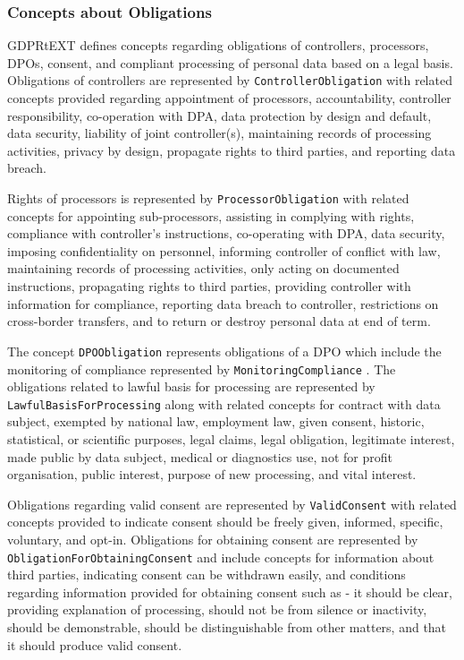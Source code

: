 \subsubsection{Concepts about Obligations}
GDPRtEXT defines concepts regarding obligations of controllers, processors, DPOs, consent, and compliant processing of personal data based on a legal basis. Obligations of controllers are represented by \texttt{ControllerObligation} with related concepts provided regarding  appointment of processors, accountability, controller responsibility, co-operation with DPA, data protection by design and default, data security, liability of joint controller(s), maintaining records of processing activities, privacy by design, propagate rights to third parties, and reporting data breach.

Rights of processors is represented by \texttt{ProcessorObligation} with related concepts for appointing sub-processors, assisting in complying with rights, compliance with controller's instructions, co-operating with DPA, data security, imposing confidentiality on personnel, informing controller of conflict with law, maintaining records of processing activities, only acting on documented instructions, propagating rights to third parties, providing controller with information for compliance, reporting data breach to controller, restrictions on cross-border transfers, and to return or destroy personal data at end of term.

The concept \texttt{DPOObligation} represents obligations of a DPO which include the monitoring of compliance represented by \texttt{MonitoringCompliance} . The obligations related to lawful basis for processing are represented by \texttt{LawfulBasisForProcessing} along with related concepts for contract with data subject, exempted by national law, employment law, given consent, historic, statistical, or scientific purposes, legal claims, legal obligation, legitimate interest, made public by data subject, medical or diagnostics use, not for profit organisation, public interest, purpose of new processing, and vital interest.

Obligations regarding valid consent are represented by \texttt{ValidConsent} with related concepts provided to indicate consent should be freely given, informed, specific, voluntary, and opt-in. 
Obligations for obtaining consent are represented by \texttt{ObligationForObtainingConsent} and include concepts for information about third parties, indicating consent can be withdrawn easily, and conditions regarding information provided for obtaining consent such as - it should be clear, providing explanation of processing, should not be from silence or inactivity, should be demonstrable, should be distinguishable from other matters, and that it should produce valid consent.

